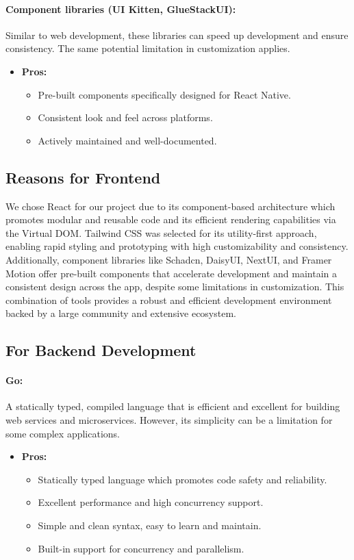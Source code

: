 \documentclass[11pt,a4paper]{article}
\begin{document}
\paragraph{Component libraries (UI Kitten, GlueStackUI):} Similar to web development, these libraries can speed up development and ensure consistency. The same potential limitation in customization applies.
\begin{itemize}
    \item \textbf{Pros:}
          \begin{itemize}
              \item Pre-built components specifically designed for React Native.
              \item Consistent look and feel across platforms.
              \item Actively maintained and well-documented.
          \end{itemize}
\end{itemize}

\subsection*{Reasons for Frontend}
We chose React for our project due to its component-based architecture which promotes modular and reusable code and its efficient rendering capabilities via the Virtual DOM. Tailwind CSS was selected for its utility-first approach, enabling rapid styling and prototyping with high customizability and consistency. Additionally, component libraries like Schadcn, DaisyUI, NextUI, and Framer Motion offer pre-built components that accelerate development and maintain a consistent design across the app, despite some limitations in customization. This combination of tools provides a robust and efficient development environment backed by a large community and extensive ecosystem.

\subsection*{For Backend Development}
\paragraph{Go:} A statically typed, compiled language that is efficient and excellent for building web services and microservices. However, its simplicity can be a limitation for some complex applications.
\begin{itemize}
    \item \textbf{Pros:}
          \begin{itemize}
              \item Statically typed language which promotes code safety and reliability.
              \item Excellent performance and high concurrency support.
              \item Simple and clean syntax, easy to learn and maintain.
              \item Built-in support for concurrency and parallelism.
          \end{itemize}
\end{itemize}
\end{document}
